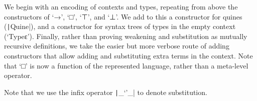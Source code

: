  We begin with an encoding of contexts and types, repeating from above
 the constructors of ‘→’, ‘□’, ‘⊤’, and ‘⊥’.  We add to this a
 constructor for quines (\texttt|Quine|), and a constructor
 for syntax trees of types in the empty context (‘Typeε’).  Finally,
 rather than proving weakening and substitution as mutually recursive
 definitions, we take the easier but more verbose route of adding
 constructors that allow adding and substituting extra terms in the
 context. Note that ‘□’ is now a function of the represented language,
 rather than a meta-level operator.


 Note that we use the infix operator \texttt|_‘’_| to denote
 substitution.

